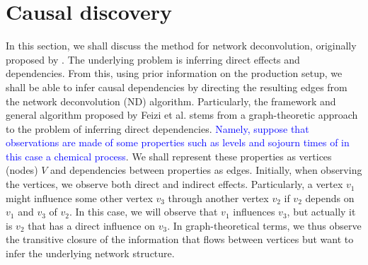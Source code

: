 \documentclass[../Thesis.tex]{subfiles}
\begin{document}
\section{Causal discovery}
In this section, we shall discuss the method for network deconvolution, originally proposed by \cite{Network-deconvolution-as-a-general-method-to-distinguish-direct-dependencies-in-networks}. The underlying problem is inferring direct effects and dependencies. From this, using prior information on the production setup, we shall be able to infer causal dependencies by directing the resulting edges from the network deconvolution (ND) algorithm. Particularly, the framework and general algorithm proposed by Feizi et al. stems from a graph-theoretic approach to the problem of inferring direct dependencies. \textcolor{blue}{Namely, suppose that observations are made of some properties such as levels and sojourn times of in this case a chemical process}. We shall represent these properties as vertices (nodes) $V$ and dependencies between properties as edges. Initially, when observing the vertices, we observe both direct and indirect effects. Particularly, a vertex $v_1$ might influence some other vertex $v_3$ through another vertex $v_2$ if $v_2$ depends on $v_1$ and $v_3$ of $v_2$. In this case, we will observe that $v_1$ influences $v_3$, but actually it is $v_2$ that has a direct influence on $v_3$. In graph-theoretical terms, we thus observe the transitive closure of the information that flows between vertices but want to infer the underlying network structure.
\end{document}
